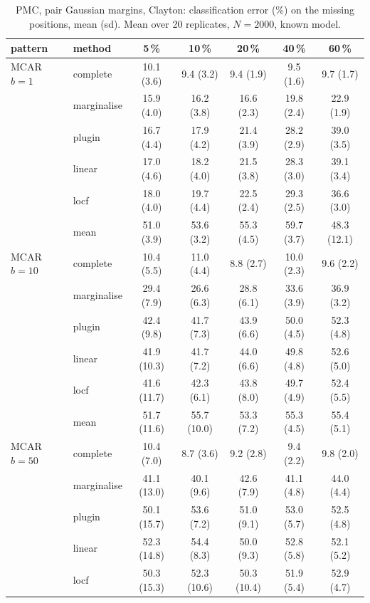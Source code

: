 \begin{table}[htbp]
  \centering
  \small
  \setlength{\tabcolsep}{4pt}
  \caption{PMC, pair Gaussian margins, Clayton: classification error (\%) on the missing positions, mean (sd). Mean over 20 replicates, $N = 2000$, known model.}
  \label{tab:missing-err-pmc_pair_gauss_k2}
  \begin{tabular}{llccccc}
    \toprule
    pattern & method & 5\,\% & 10\,\% & 20\,\% & 40\,\% & 60\,\% \\
    \midrule
    MCAR $b{=}1$ & complete & 10.1 (3.6) & 9.4 (3.2) & 9.4 (1.9) & 9.5 (1.6) & 9.7 (1.7) \\
     & marginalise & 15.9 (4.0) & 16.2 (3.8) & 16.6 (2.3) & 19.8 (2.4) & 22.9 (1.9) \\
     & plugin & 16.7 (4.4) & 17.9 (4.2) & 21.4 (3.9) & 28.2 (2.9) & 39.0 (3.5) \\
     & linear & 17.0 (4.6) & 18.2 (4.0) & 21.5 (3.8) & 28.3 (3.0) & 39.1 (3.4) \\
     & locf & 18.0 (4.0) & 19.7 (4.4) & 22.5 (2.4) & 29.3 (2.5) & 36.6 (3.0) \\
     & mean & 51.0 (3.9) & 53.6 (3.2) & 55.3 (4.5) & 59.7 (3.7) & 48.3 (12.1) \\
    \addlinespace
    MCAR $b{=}10$ & complete & 10.4 (5.5) & 11.0 (4.4) & 8.8 (2.7) & 10.0 (2.3) & 9.6 (2.2) \\
     & marginalise & 29.4 (7.9) & 26.6 (6.3) & 28.8 (6.1) & 33.6 (3.9) & 36.9 (3.2) \\
     & plugin & 42.4 (9.8) & 41.7 (7.3) & 43.9 (6.6) & 50.0 (4.5) & 52.3 (4.8) \\
     & linear & 41.9 (10.3) & 41.7 (7.2) & 44.0 (6.6) & 49.8 (4.8) & 52.6 (5.0) \\
     & locf & 41.6 (11.7) & 42.3 (6.1) & 43.8 (8.0) & 49.7 (4.9) & 52.4 (5.5) \\
     & mean & 51.7 (11.6) & 55.7 (10.0) & 53.3 (7.2) & 55.3 (4.5) & 55.4 (5.1) \\
    \addlinespace
    MCAR $b{=}50$ & complete & 10.4 (7.0) & 8.7 (3.6) & 9.2 (2.8) & 9.4 (2.2) & 9.8 (2.0) \\
     & marginalise & 41.1 (13.0) & 40.1 (9.6) & 42.6 (7.9) & 41.1 (4.8) & 44.0 (4.4) \\
     & plugin & 50.1 (15.7) & 53.6 (7.2) & 51.0 (9.1) & 53.0 (5.7) & 52.5 (4.8) \\
     & linear & 52.3 (14.8) & 54.4 (8.3) & 50.0 (9.3) & 52.8 (5.8) & 52.1 (5.2) \\
     & locf & 50.3 (15.3) & 52.3 (10.6) & 50.3 (10.4) & 51.9 (5.4) & 52.9 (4.7) \\

\end{tabular}
\end{table}
